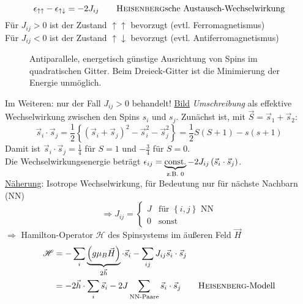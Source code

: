 \begin{equation}
    \epsilon_{\uparrow \uparrow} - \epsilon_{\uparrow \downarrow} = - 2 J_{ij} \qquad \text{\textsc{Heisenberg}sche Austausch-Wechselwirkung}
\end{equation}
Für $J_{ij} > 0$ ist der Zustand $\uparrow \uparrow$ bevorzugt (evtl. Ferromagnetismus) \\
Für $J_{ij} < 0$ ist der Zustand $\uparrow \downarrow$ bevorzugt (evtl. Antiferromagnetismus)
\begin{figure}[H]
        \centering
        \def\svgwidth{0.6\textwidth}
        
        \caption{Antiparallele, energetisch günstige Ausrichtung von Spins im quadratischen Gitter.
        Beim Dreieck-Gitter ist die Minimierung der Energie unmöglich.}
        \label{img:Frustration}
\end{figure}
Im Weiteren: nur der Fall $J_{ij} > 0$ behandelt!
\underline{Bild} \emph{Umschreibung} als effektive Wechselwirkung zwischen den Spins $s_i$ und $s_j$. Zunächst ist,
mit $\vec{S} = \vec{s}_1 + \vec{s}_2$:
\begin{equation}
    \vec{s}_i \cdot \vec{s}_j = \frac{1}{2} \left\{ \left( \vec{s}_i + \vec{s}_j \right)^2 - \vec{s}_i^2 - \vec{s}_j^2  \right\} = \frac{1}{2} S (S + 1) - s(s+1)
\end{equation}
Damit ist $\vec{s}_i \cdot \vec{s}_j = \frac{1}{4} $ für $S = 1$ und $-\frac{3}{4}$ für $S = 0$. \\
Die Wechselwirkungsenergie beträgt $\epsilon_{ij} = \underbrace{\text{const.}}_{\text{z.B. } 0} - 2 J_{ij} \left( \vec{s}_i \cdot \vec{s}_j  \right) $.\\
\underline{Näherung}: Isotrope Wechselwirkung, für Bedeutung nur für nächste Nachbarn (NN)
\begin{equation}
    \Rightarrow J_{ij} =
    \begin{cases}
        J & \text{für } \left\{ i, j \right\} \text{ NN} \\
        0 & \text{sonst}
    \end{cases}
\end{equation}
$\Rightarrow$ Hamilton-Operator $\mathscr{H}$ des Spinsystems im äußeren Feld $\vec{H}$
\begin{equation}
    \begin{split}
        \mathscr{H} &= - \sum_i \underbrace{\left( g \mu_B \vec{H} \right)}_{2 \vec{h}} \cdot \vec{s}_i - \sum_{ij} J_{ij} \vec{s}_i \cdot \vec{s}_j \\
        &= - 2 \vec{h} \cdot \sum_i \vec{s}_i - 2 J \sum_{\text{NN-Paare}} \vec{s}_i \cdot \vec{s}_j \qquad \text{\textsc{Heisenberg}-Modell}
    \end{split}
\end{equation}
